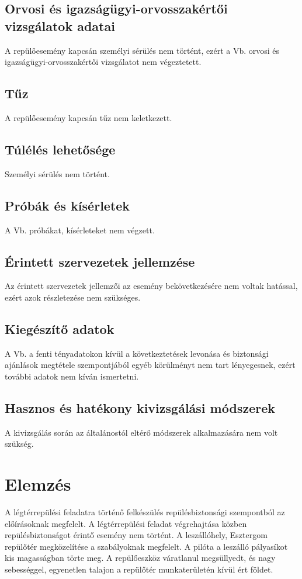 \documentclass[a4paper,10pt]{article}
\begin{document}
\subsection{Orvosi és igazságügyi-orvosszakértői vizsgálatok adatai}
A repülőesemény kapcsán személyi sérülés nem történt, ezért a Vb. orvosi és 
igazságügyi-orvosszakértői vizsgálatot nem végeztetett.

\subsection{Tűz}
A repülőesemény kapcsán tűz nem keletkezett.

\subsection{Túlélés lehetősége}
Személyi sérülés nem történt.

\subsection{Próbák és kísérletek}
A Vb. próbákat, kísérleteket nem végzett.

\subsection{Érintett szervezetek jellemzése}
Az érintett szervezetek jellemzői az esemény bekövetkezésére nem voltak 
hatással, ezért azok részletezése nem szükséges.

\subsection{Kiegészítő adatok}
A Vb. a fenti tényadatokon kívül a következtetések levonása és biztonsági 
ajánlások megtétele szempontjából egyéb körülményt nem tart lényegesnek, ezért 
további adatok nem kíván ismertetni.

\subsection{Hasznos és hatékony kivizsgálási módszerek}
A kivizsgálás során az általánostól eltérő módszerek alkalmazására nem volt 
szükség.

\section{Elemzés}
A légtérrepülési feladatra történő felkészülés repülésbiztonsági szempontból az 
előírásoknak megfelelt. A légtérrepülési feladat végrehajtása közben 
repülésbiztonságot érintő esemény nem történt. A leszállóhely, Esztergom 
repülőtér megközelítése a szabályoknak megfelelt. A pilóta a leszálló 
pályasíkot kis magasságban törte meg. A repülőeszköz váratlanul megsüllyedt, és 
nagy sebességgel, egyenetlen talajon a repülőtér munkaterületén kívül ért 
földet.
\end{document}
